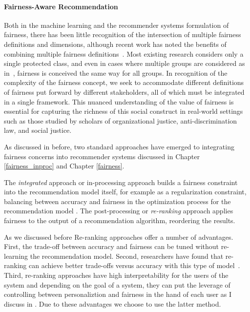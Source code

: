 \noindent \paragraph{Fairness-Aware Recommendation} \newline
{}

\indent Both in the machine learning and the recommender systems formulation of fairness, there has been little recognition of the intersection of multiple fairness definitions and dimensions, although recent work has noted the benefits of combining multiple fairness definitions~\cite{beutel2019fairness}. Most existing research considers only a single protected class, and even in cases where multiple groups are considered as in~\cite{buolamwini2018gender,hebert2018multicalibration,kearns2017preventing,zhu2018fairness}, fairness is conceived the same way for all groups. In recognition of the complexity of the fairness concept, we seek to accommodate different definitions of fairness put forward by different stakeholders, all of which must be integrated in a single framework. This nuanced understanding of the value of fairness is essential for capturing the richness of this social construct in real-world settings such as those studied by scholars of organizational justice, anti-discrimination law, and social justice.

As discussed in before, two standard approaches have emerged to integrating fairness concerns into recommender systems discussed in Chapter \ref{fairness_inproc} and Chapter \ref{fairness}.

The \textit{integrated} approach or in-processing approach builds a fairness constraint into the recommendation model itself, for example as a regularization constraint, balancing between accuracy and fairness in the optimization process for the recommendation model \cite{kamishima2012fairness,yao2017beyond}. The post-processing or \textit{re-ranking} approach applies fairness to the output of a recommendation algorithm, reordering the results. 

As we discussed before Re-ranking approaches offer a number of advantages. First, the trade-off between accuracy and fairness can be tuned without re-learning the recommendation model. Second, researchers have found that re-ranking can achieve better trade-offs versus accuracy with this type of model~\cite{pmlr-v81-ekstrand18b,abdollahpouri2019managing,liu2019personalized}. Third, re-ranking approaches have high interpretability for the users of the system and depending on the goal of a system, they can put the leverage of controlling between personaliztion and fairness in the hand of each user as I discuss in \cite{Sonboli2021transparency}. Due to these advantages we choose to use the latter method.

